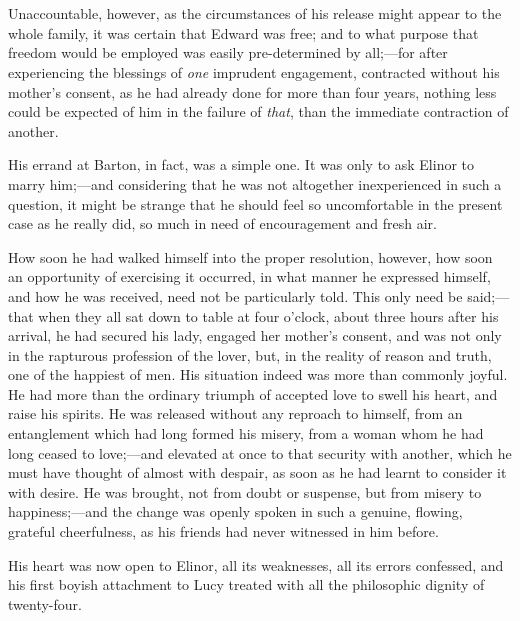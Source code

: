 \chapter{} %

Unaccountable, however, as the circumstances of his release might appear to the whole family, it was certain that Edward was free; and to what purpose that freedom would be employed was easily pre-determined by all;---for after experiencing the blessings of {\em one} imprudent engagement, contracted without his mother's consent, as he had already done for more than four years, nothing less could be expected of him in the failure of {\em that}, than the immediate contraction of another.

His errand at Barton, in fact, was a simple one. It was only to ask Elinor to marry him;---and considering that he was not altogether inexperienced in such a question, it might be strange that he should feel so uncomfortable in the present case as he really did, so much in need of encouragement and fresh air.

How soon he had walked himself into the proper resolution, however, how soon an opportunity of exercising it occurred, in what manner he expressed himself, and how he was received, need not be particularly told. This only need be said;---that when they all sat down to table at four o'clock, about three hours after his arrival, he had secured his lady, engaged her mother's consent, and was not only in the rapturous profession of the lover, but, in the reality of reason and truth, one of the happiest of men. His situation indeed was more than commonly joyful. He had more than the ordinary triumph of accepted love to swell his heart, and raise his spirits. He was released without any reproach to himself, from an entanglement which had long formed his misery, from a woman whom he had long ceased to love;---and elevated at once to that security with another, which he must have thought of almost with despair, as soon as he had learnt to consider it with desire. He was brought, not from doubt or suspense, but from misery to happiness;---and the change was openly spoken in such a genuine, flowing, grateful cheerfulness, as his friends had never witnessed in him before.

His heart was now open to Elinor, all its weaknesses, all its errors confessed, and his first boyish attachment to Lucy treated with all the philosophic dignity of twenty-four.

